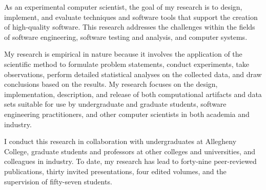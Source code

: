 \documentclass[11pt,letterpaper,sans]{moderncv}
\begin{document}
{\small As an experimental computer scientist, the goal of my research is to design, implement, and evaluate
  techniques and software tools that support the creation of high-quality software.  This research addresses the
challenges within the fields of software engineering, software testing and analysis, and computer systems.}
\vspace*{.05in}

{\small My research is empirical in nature because it involves the application of the scientific method to formulate
  problem statements, conduct experiments, take observations, perform detailed statistical analyses on the collected
  data, and draw conclusions based on the results.  My research focuses on the design, implementation, description, and
  release of both computational artifacts and data sets suitable for use by undergraduate and graduate students,
software engineering practitioners, and other computer scientists in both academia and industry.}
\vspace*{.05in}

{\small I conduct this research in collaboration with undergraduates at Allegheny College, graduate students and
professors at other colleges and universities, and colleagues in industry. To date, my research has lead to forty-nine
peer-reviewed publications, thirty invited presentations, four edited volumes, and the supervision of fifty-seven
students.}



\nocite{*}

\setlength\bibitemsep{-.15in}

\renewcommand*{\bibfont}{\small}


\vspace*{-.1in}
\printbibliography[filter=papers,title={Publications}]
\end{document}
